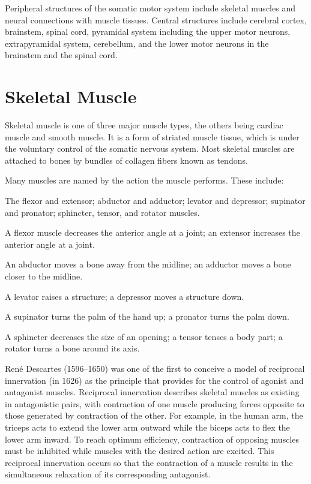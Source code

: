 \documentclass[]{book}
\begin{document}
Peripheral structures of the somatic motor system include skeletal muscles and neural connections with muscle tissues. Central structures include cerebral cortex, brainstem, spinal cord, pyramidal system including the upper motor neurons, extrapyramidal system, cerebellum, and the lower motor neurons in the brainstem and the spinal cord.

\hypertarget{skeletal-muscle}{%
\section{Skeletal Muscle}\label{skeletal-muscle}}

Skeletal muscle is one of three major muscle types, the others being cardiac muscle and smooth muscle. It is a form of striated muscle tissue, which is under the voluntary control of the somatic nervous system. Most skeletal muscles are attached to bones by bundles of collagen fibers known as tendons.

Many muscles are named by the action the muscle performs. These include:

The flexor and extensor; abductor and adductor; levator and depressor; supinator and pronator; sphincter, tensor, and rotator muscles.

A flexor muscle decreases the anterior angle at a joint; an extensor increases the anterior angle at a joint.

An abductor moves a bone away from the midline; an adductor moves a bone closer to the midline.

A levator raises a structure; a depressor moves a structure down.

A supinator turns the palm of the hand up; a pronator turns the palm down.

A sphincter decreases the size of an opening; a tensor tenses a body part; a rotator turns a bone around its axis.

René Descartes (1596--1650) was one of the first to conceive a model of reciprocal innervation (in 1626) as the principle that provides for the control of agonist and antagonist muscles. Reciprocal innervation describes skeletal muscles as existing in antagonistic pairs, with contraction of one muscle producing forces opposite to those generated by contraction of the other. For example, in the human arm, the triceps acts to extend the lower arm outward while the biceps acts to flex the lower arm inward. To reach optimum efficiency, contraction of opposing muscles must be inhibited while muscles with the desired action are excited. This reciprocal innervation occurs so that the contraction of a muscle results in the simultaneous relaxation of its corresponding antagonist.
\end{document}
